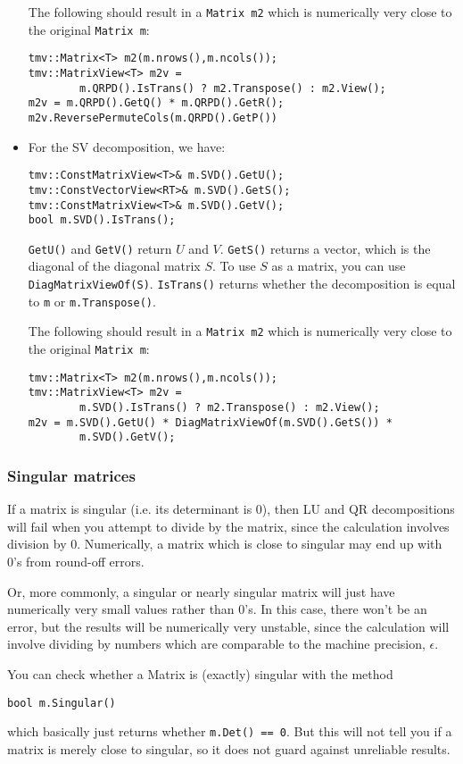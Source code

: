 \documentclass[twoside,letterpaper,11pt]{article}
\renewcommand{\tt}[1]{{\texttt {#1}}}
\begin{document}
\begin{itemize}
The following should result in a \tt{Matrix m2} which is numerically very close to
the original \tt{Matrix m}:
\begin{verbatim}
tmv::Matrix<T> m2(m.nrows(),m.ncols());
tmv::MatrixView<T> m2v = 
        m.QRPD().IsTrans() ? m2.Transpose() : m2.View();
m2v = m.QRPD().GetQ() * m.QRPD().GetR();
m2v.ReversePermuteCols(m.QRPD().GetP())
\end{verbatim}

\item
For the SV decomposition, we have:
\begin{verbatim}
tmv::ConstMatrixView<T>& m.SVD().GetU();
tmv::ConstVectorView<RT>& m.SVD().GetS();
tmv::ConstMatrixView<T>& m.SVD().GetV();
bool m.SVD().IsTrans();
\end{verbatim}
\tt{GetU()} and \tt{GetV()} return $U$ and $V$.
\tt{GetS()} returns a vector, which is the diagonal
of the diagonal matrix $S$.  To use $S$ as a matrix, you can use
\tt{DiagMatrixViewOf(S)}.
\tt{IsTrans()} returns whether
the decomposition is equal to \tt{m} or \tt{m.Transpose()}.  

The following should result in a \tt{Matrix m2} which is numerically very close to
the original \tt{Matrix m}:
\begin{verbatim}
tmv::Matrix<T> m2(m.nrows(),m.ncols());
tmv::MatrixView<T> m2v = 
        m.SVD().IsTrans() ? m2.Transpose() : m2.View();
m2v = m.SVD().GetU() * DiagMatrixViewOf(m.SVD().GetS()) * 
        m.SVD().GetV();
\end{verbatim}
\end{itemize}

\subsubsection{Singular matrices}
\label{singular}

If a matrix is singular (i.e. its determinant is 0), 
then LU and QR decompositions
will fail when you attempt to divide by the matrix, since the 
calculation involves division by 0.  Numerically, a matrix
which is close to singular may end up with 0's from round-off
errors.  

Or, more commonly, a singular or nearly singular matrix
will just have numerically very small values rather than 0's.  In this 
case, there won't be an error, but the results will be numerically
very unstable, since the calculation will involve dividing by numbers
which are comparable to the machine precision, $\epsilon$.

You can check whether a Matrix is (exactly) singular with 
the method
\begin{verbatim}
bool m.Singular()
\end{verbatim}
which basically just returns whether \tt{m.Det() == 0}.  But this will not
tell you if a matrix is merely close to singular, so it does not guard 
against unreliable results.
\end{document}
